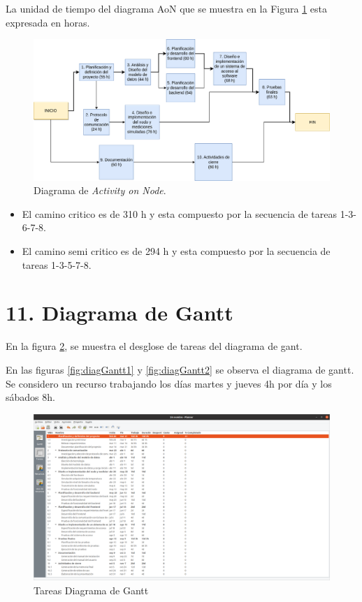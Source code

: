 \documentclass[
11pt, %
]{charter}
\begin{document}
La unidad de tiempo del diagrama AoN que se muestra en la Figura \ref{fig:AoN} esta expresada en horas.

\begin{figure}[htpb]
\centering 
\includegraphics[width=1\textwidth]{./Figuras/DiagramaActivityONNode.png}
\caption{Diagrama de \textit{Activity on Node}.}
\label{fig:AoN}
\end{figure}

\begin{itemize}
	\item El camino critico es de 310 h y esta compuesto por la secuencia de tareas 1-3-6-7-8.
	\item El camino semi critico es de 294 h y esta compuesto por la secuencia de tareas 1-3-5-7-8.
\end{itemize}

\section{11. Diagrama de Gantt}
\label{sec:gantt}



En la figura \ref{fig:TareasGant}, se muestra el desglose de tareas del diagrama de gant.

En las figuras \ref{fig:diagGantt1} y \ref{fig:diagGantt2} se observa el diagrama de gantt. Se considero un recurso trabajando los días martes y jueves 4h por día y los sábados 8h. 

\begin{landscape}
\begin{figure}[htpb]
\centering 
\includegraphics[height=.85\textheight]{./Figuras/TareasGant.png}
\caption{Tareas Diagrama de Gantt}
\label{fig:TareasGant}
\end{figure}
\end{landscape}
\end{document}
